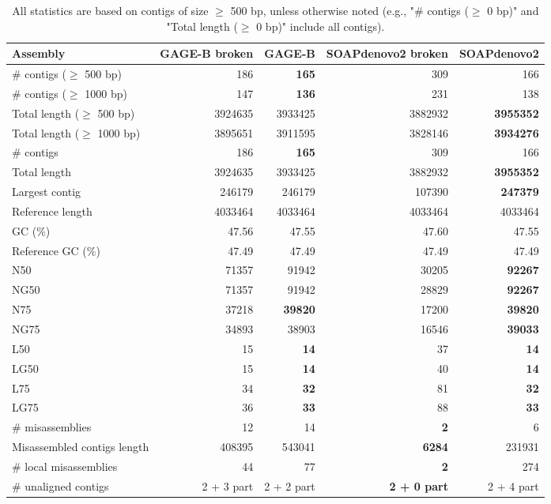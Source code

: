 \documentclass[12pt,a4paper]{article}
\begin{document}
\begin{table}[ht]
\begin{center}
\caption{All statistics are based on contigs of size $\geq$ 500 bp, unless otherwise noted (e.g., "\# contigs ($\geq$ 0 bp)" and "Total length ($\geq$ 0 bp)" include all contigs).}
\begin{tabular}{|l*{4}{|r}|}
\hline
Assembly & GAGE-B broken & GAGE-B & SOAPdenovo2 broken & SOAPdenovo2 \\ \hline
\# contigs ($\geq$ 500 bp) & 186 & {\bf 165} & 309 & 166 \\ \hline
\# contigs ($\geq$ 1000 bp) & 147 & {\bf 136} & 231 & 138 \\ \hline
Total length ($\geq$ 500 bp) & 3924635 & 3933425 & 3882932 & {\bf 3955352} \\ \hline
Total length ($\geq$ 1000 bp) & 3895651 & 3911595 & 3828146 & {\bf 3934276} \\ \hline
\# contigs & 186 & {\bf 165} & 309 & 166 \\ \hline
Total length & 3924635 & 3933425 & 3882932 & {\bf 3955352} \\ \hline
Largest contig & 246179 & 246179 & 107390 & {\bf 247379} \\ \hline
Reference length & 4033464 & 4033464 & 4033464 & 4033464 \\ \hline
GC (\%) & 47.56 & 47.55 & 47.60 & 47.55 \\ \hline
Reference GC (\%) & 47.49 & 47.49 & 47.49 & 47.49 \\ \hline
N50 & 71357 & 91942 & 30205 & {\bf 92267} \\ \hline
NG50 & 71357 & 91942 & 28829 & {\bf 92267} \\ \hline
N75 & 37218 & {\bf 39820} & 17200 & {\bf 39820} \\ \hline
NG75 & 34893 & 38903 & 16546 & {\bf 39033} \\ \hline
L50 & 15 & {\bf 14} & 37 & {\bf 14} \\ \hline
LG50 & 15 & {\bf 14} & 40 & {\bf 14} \\ \hline
L75 & 34 & {\bf 32} & 81 & {\bf 32} \\ \hline
LG75 & 36 & {\bf 33} & 88 & {\bf 33} \\ \hline
\# misassemblies & 12 & 14 & {\bf 2} & 6 \\ \hline
Misassembled contigs length & 408395 & 543041 & {\bf 6284} & 231931 \\ \hline
\# local misassemblies & 44 & 77 & {\bf 2} & 274 \\ \hline
\# unaligned contigs & 2 + 3 part & 2 + 2 part & {\bf 2 + 0 part} & 2 + 4 part \\ \hline

\end{tabular}
\end{center}
\end{table}
\end{document}
